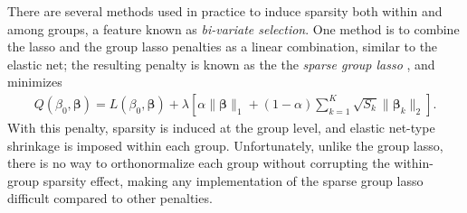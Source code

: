 \documentclass[11pt]{article}
\begin{document}

There are several methods used in practice to induce sparsity both within and among groups, a feature known as \textit{bi-variate selection}. 
One method is to combine the lasso and the group lasso penalties as a linear combination, similar to the elastic net; the resulting penalty is known as the the \textit{sparse group lasso} \cite{simon2013sparse}, and minimizes 
\begin{align}
    \label{sparsegrouplasso}
    Q(\beta_0, \bm{\beta}) = L(\beta_0, \bm{\beta}) + \lambda \left[ \alpha \| \bm{\beta} \|_1 + (1 - \alpha) \sum_{k=1}^K \sqrt{S_k}  \| \bm{\beta}_k \|_2 \right].
\end{align}
With this penalty, sparsity is induced at the group level, and elastic net-type shrinkage is imposed within each group. Unfortunately, unlike the group lasso, there is no way to orthonormalize each group without corrupting the within-group sparsity effect, making any implementation of the sparse group lasso difficult compared to other penalties.
\end{document}
